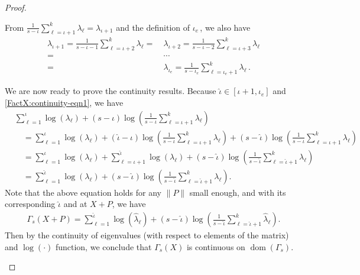 \documentclass[smallextended]{svjour3hack}       %
\DeclareMathOperator{\dom}{dom}
\begin{document}
\begin{proof}
\begin{itemize}
From $\frac{1}{s-\iota}\sum_{\ell=\iota+1}^k \lambda_{\ell}= \lambda_{\iota +1}$ and the definition of $\iota_e$\,, we also have
 \begin{align}
     \textstyle\lambda_{\iota+1} = \frac{1}{s-\iota-1}\sum_{\ell=\iota+2}^k \lambda_{\ell}\nonumber
     = &~\textstyle\lambda_{\iota+2} =  \frac{1}{s-\iota-2}\sum_{\ell=\iota+3}^k \lambda_{\ell}\nonumber\\
     =& ~\textstyle\cdots\nonumber\\
     =&~  \textstyle\lambda_{\iota_e} = \frac{1}{s-\iota_e}\sum_{\ell=\iota_e+1}^k \lambda_{\ell}\,. \label{FactX:continuity-eqn1}
 \end{align}

 We are now ready to prove the continuity results. Because $\hat\iota\in [\iota+1, \iota_e]$ and \eqref{FactX:continuity-eqn1}, we have
\begin{align*}
    &\textstyle\sum_{\ell=1}^{\iota} \log(\lambda_\ell)+(s-\iota)\log\left(\frac{1}{s-\iota}\sum_{\ell=\iota+1}^k \lambda_{\ell}\right)\\
    &\quad= \textstyle\sum_{\ell=1}^{\iota} \log(\lambda_\ell)+(\hat\iota-\iota)\log\!\left(\!\frac{1}{s-\iota}\sum_{\ell=\iota+1}^k \lambda_{\ell}\!\right) \!+\! (s-\hat \iota)\log\!\left(\!\frac{1}{s-\iota}\sum_{\ell=\iota+1}^k \lambda_{\ell}\!\right)\\
    &\quad= \textstyle\sum_{\ell=1}^{\iota} \log(\lambda_\ell)+\sum_{\ell=\iota+1}^{\hat \iota} \log(\lambda_\ell) + (s-\hat \iota)\log\left(\frac{1}{s-\hat \iota}\sum_{\ell=\hat \iota+1}^k \lambda_{\ell}\right)\\
    &\quad= \textstyle\sum_{\ell=1}^{\hat \iota} \log(\lambda_\ell) + (s-\hat \iota)\log\left(\frac{1}{s-\hat \iota}\sum_{\ell=\hat \iota+1}^k \lambda_{\ell}\right).
\end{align*}
Note that the above equation holds for any $\|P\|$ small enough, and with its corresponding $\hat \iota$ and at $X+P$, we have
\begin{align*}
    \textstyle\Gamma_s(X+P)=\sum_{\ell=1}^{\hat\iota} \log(\hat \lambda_\ell)+(s-\hat \iota)\log\left(\frac{1}{s-\hat\iota}\sum_{\ell=\hat \iota+1}^k \hat \lambda_{\ell}\right).
\end{align*}
Then by the continuity of eigenvalues (with respect to elements of the matrix) and $\log(\cdot)$ function, we conclude that  $\Gamma_s(X)$ is continuous on $\dom(\Gamma_s)$.
\end{itemize}




\end{proof}
\end{document}
